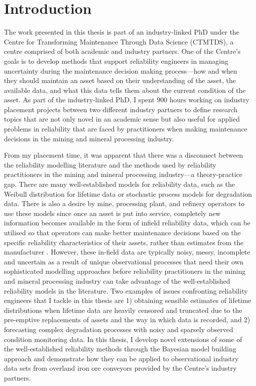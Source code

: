 \chapter{Introduction}\label{chap:chapter1}

The work presented in this thesis is part of an industry-linked PhD under the Centre for Transforming Maintenance Through Data Science (CTMTDS), a centre comprised of both academic and industry partners. One of the Centre's goals is to develop methods that support reliability engineers in managing uncertainty during the maintenance decision making process---how and when they should maintain an asset based on their understanding of the asset, the available data, and what this data tells them about the current condition of the asset. As part of the industry-linked PhD, I spent 900 hours working on industry placement projects between two different industry partners to define research topics that are not only novel in an academic sense but also useful for applied problems in reliability that are faced by practitioners when making maintenance decisions in the mining and mineral processing industry.

From my placement time, it was apparent that there was a disconnect between the reliability modelling literature and the methods used by reliability practitioners in the mining and mineral processing industry---a theory-practice gap. There are many well-established models for reliability data, such as the Weibull distribution for lifetime data or stochastic process models for degradation data. There is also a desire by mine, processing plant, and refinery operators to use these models since once an asset is put into service, completely new information becomes available in the form of infield reliability data, which can be utilised so that operators can make better maintenance decisions based on the specific reliability characteristics of their assets, rather than estimates from the manufacturer \citep{jardine2013}. However, these in-field data are typically noisy, messy, incomplete and uncertain as a result of unique observational processes that need their own sophisticated modelling approaches before reliability practitioners in the mining and mineral processing industry can take advantage of the well-established reliability models in the literature. Two examples of issues confronting reliability engineers that I tackle in this thesis are 1) obtaining sensible estimates of lifetime distributions when lifetime data are heavily censored and truncated due to the pre-emptive replacements of assets and the way in which data is recorded, and 2) forecasting complex degradation processes with noisy and sparsely observed condition monitoring data. In this thesis, I develop novel extensions of some of the well-established reliability methods through the Bayesian model building approach \citep{gelman_workflow_2020} and demonstrate how they can be applied to observational industry data sets from overland iron ore conveyors provided by the Centre's industry partners.


